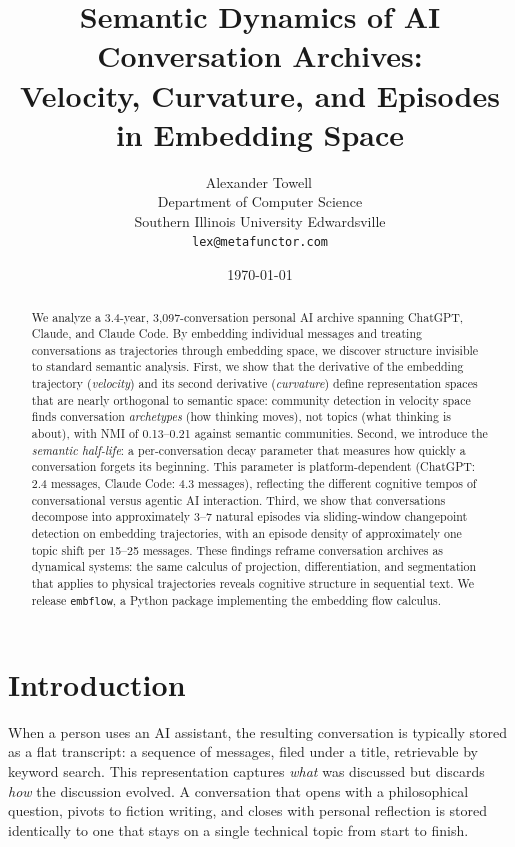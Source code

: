 \documentclass[11pt]{article}
\title{Semantic Dynamics of AI Conversation Archives:\\
Velocity, Curvature, and Episodes in Embedding Space}
\author{
  Alexander Towell\,\orcidlink{0000-0001-6443-9897}\\
  Department of Computer Science\\
  Southern Illinois University Edwardsville\\
  \texttt{lex@metafunctor.com}
}
\date{\today}
\begin{document}
\maketitle

\begin{abstract}
We analyze a 3.4-year, 3,097-conversation personal AI archive spanning ChatGPT, Claude, and Claude Code. By embedding individual messages and treating conversations as trajectories through embedding space, we discover structure invisible to standard semantic analysis. First, we show that the derivative of the embedding trajectory (\emph{velocity}) and its second derivative (\emph{curvature}) define representation spaces that are nearly orthogonal to semantic space: community detection in velocity space finds conversation \emph{archetypes} (how thinking moves), not topics (what thinking is about), with NMI of 0.13--0.21 against semantic communities. Second, we introduce the \emph{semantic half-life}: a per-conversation decay parameter that measures how quickly a conversation forgets its beginning. This parameter is platform-dependent (ChatGPT: 2.4 messages, Claude Code: 4.3 messages), reflecting the different cognitive tempos of conversational versus agentic AI interaction. Third, we show that conversations decompose into approximately 3--7 natural episodes via sliding-window changepoint detection on embedding trajectories, with an episode density of approximately one topic shift per 15--25 messages. These findings reframe conversation archives as dynamical systems: the same calculus of projection, differentiation, and segmentation that applies to physical trajectories reveals cognitive structure in sequential text. We release \texttt{embflow}, a Python package implementing the embedding flow calculus.
\end{abstract}

\section{Introduction}

When a person uses an AI assistant, the resulting conversation is typically stored as a flat transcript: a sequence of messages, filed under a title, retrievable by keyword search. This representation captures \emph{what} was discussed but discards \emph{how} the discussion evolved. A conversation that opens with a philosophical question, pivots to fiction writing, and closes with personal reflection is stored identically to one that stays on a single technical topic from start to finish.
\end{document}
